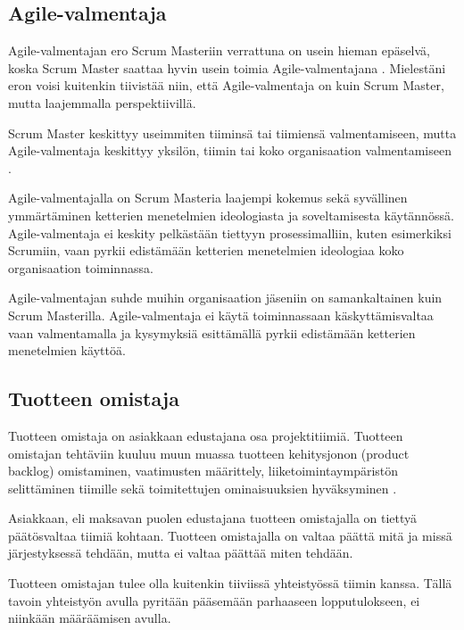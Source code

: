 \documentclass[a4paper]{article}
\begin{document}
\subsection{Agile-valmentaja}

Agile-valmentajan ero Scrum Masteriin verrattuna on usein hieman epäselvä, koska Scrum Master saattaa hyvin usein toimia Agile-valmentajana \citep{grosjean2010}. Mielestäni eron voisi kuitenkin tiivistää niin, että Agile-valmentaja on kuin Scrum Master, mutta laajemmalla perspektiivillä.

Scrum Master keskittyy useimmiten tiiminsä tai tiimiensä valmentamiseen, mutta Agile-valmentaja keskittyy yksilön, tiimin tai koko organisaation valmentamiseen \citep{grosjean2010}. 

Agile-valmentajalla on Scrum Masteria laajempi kokemus sekä syvällinen ymmärtäminen ketterien menetelmien ideologiasta ja soveltamisesta käytännössä. Agile-valmentaja ei keskity pelkästään tiettyyn prosessimalliin, kuten esimerkiksi Scrumiin, vaan pyrkii edistämään ketterien menetelmien ideologiaa koko organisaation toiminnassa.

Agile-valmentajan suhde muihin organisaation jäseniin on samankaltainen kuin Scrum Masterilla. Agile-valmentaja ei käytä toiminnassaan käskyttämisvaltaa vaan valmentamalla ja kysymyksiä esittämällä pyrkii edistämään ketterien menetelmien käyttöä.

\subsection{Tuotteen omistaja}

Tuotteen omistaja on asiakkaan edustajana osa projektitiimiä. Tuotteen omistajan tehtäviin kuuluu muun muassa tuotteen kehitysjonon (product backlog) omistaminen, vaatimusten määrittely, liiketoimintaympäristön selittäminen tiimille sekä toimitettujen ominaisuuksien hyväksyminen \citep{augustine2005}.

Asiakkaan, eli maksavan puolen edustajana tuotteen omistajalla on tiettyä päätösvaltaa tiimiä kohtaan. Tuotteen omistajalla on valtaa päättä mitä ja missä järjestyksessä tehdään, mutta ei valtaa päättää miten tehdään.

Tuotteen omistajan tulee olla kuitenkin tiiviissä yhteistyössä tiimin kanssa. Tällä tavoin yhteistyön avulla pyritään pääsemään parhaaseen lopputulokseen, ei niinkään määräämisen avulla.

\end{document}
